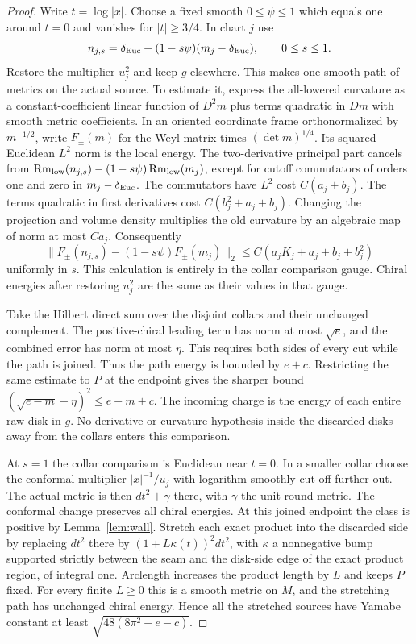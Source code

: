 \documentclass[11pt,letterpaper]{article}
\numberwithin{equation}{section}
\theoremstyle{remark}
\DeclareMathOperator{\Rm}{Rm}
\newcommand{\Eucl}{\delta_{\rm Euc}}
\begin{document}
\begin{proof}
Write \(t=\log|x|\). Choose a fixed smooth \(0\le\psi\le1\) which
equals one around \(t=0\) and vanishes for \(|t|\ge3/4\).
In chart \(j\) use
\[
 n_{j,s}=\Eucl+(1-s\psi)(m_j-\Eucl),\qquad 0\le s\le1.
\]
Restore the multiplier \(u_j^2\) and keep \(g\) elsewhere. This
makes one smooth path of metrics on the actual source. To estimate
it, express the all-lowered curvature as a constant-coefficient
linear function of \(D^2m\) plus terms quadratic in \(Dm\) with
smooth metric coefficients. In an oriented coordinate frame
orthonormalized by \(m^{-1/2}\), write \(F_\pm(m)\) for the Weyl
matrix times \((\det m)^{1/4}\). Its squared Euclidean \(L^2\) norm
is the local energy. The two-derivative principal part cancels
from \(\Rm_{\rm low}(n_{j,s})-(1-s\psi)\Rm_{\rm low}(m_j)\),
except for cutoff commutators of orders one and zero in \(m_j-\Eucl\).
The commutators have \(L^2\) cost \(C(a_j+b_j)\). The terms quadratic
in first derivatives cost \(C(b_j^2+a_j+b_j)\). Changing the
projection and volume density multiplies the old curvature by an
algebraic map of norm at most \(Ca_j\). Consequently
\[
 \|F_\pm(n_{j,s})-(1-s\psi)F_\pm(m_j)\|_2
 \le C(a_jK_j+a_j+b_j+b_j^2)
\]
uniformly in \(s\). This calculation is entirely in the collar
comparison gauge. Chiral energies after restoring \(u_j^2\)
are the same as their values in that gauge.

Take the Hilbert direct sum over the disjoint collars and their
unchanged complement. The positive-chiral leading term has norm
at most \(\sqrt e\), and the combined error has norm at most
\(\eta\). This requires both sides of every cut while the path is
joined. Thus the path energy is bounded by \(e+c\). Restricting
the same estimate to \(P\) at the endpoint gives the sharper
bound \((\sqrt{e-m}+\eta)^2\le e-m+c\). The incoming charge is the
energy of each entire raw disk in \(g\). No derivative or curvature
hypothesis inside the discarded disks away from the collars enters
this comparison.

At \(s=1\) the collar comparison is Euclidean near \(t=0\). In a
smaller collar choose the conformal multiplier \(|x|^{-1}/u_j\)
with logarithm smoothly cut off further out. The actual metric is
then \(dt^2+\gamma\) there, with \(\gamma\) the unit round metric.
The conformal change preserves all chiral energies. At this joined
endpoint the class is positive by Lemma~\ref{lem:wall}. Stretch
each exact product into the discarded side by replacing \(dt^2\)
there by \((1+L\kappa(t))^2dt^2\), with \(\kappa\) a nonnegative
bump supported strictly between the seam and the disk-side edge of
the exact product region, of integral one. Arclength increases the
product length by \(L\) and keeps \(P\) fixed. For every finite
\(L\ge0\) this is a smooth metric on \(M\), and the stretching path
has unchanged chiral energy. Hence all the stretched sources have
Yamabe constant at least \(\sqrt{48(8\pi^2-e-c)}\).


\end{proof}
\end{document}
